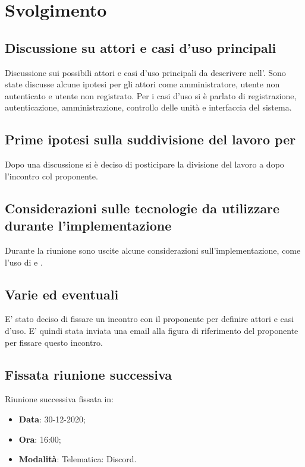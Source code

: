\documentclass[]{article}
\begin{document}
	\newpage

	\section{Svolgimento}
		\subsection{Discussione su attori e casi d'uso principali}
        Discussione sui possibili attori e casi d'uso principali da descrivere nell'. Sono state discusse alcune ipotesi per gli attori come amministratore, utente non autenticato e utente non registrato. Per i casi d'uso si è parlato di registrazione, autenticazione, amministrazione, controllo delle unità e interfaccia del sistema.

        \subsection{Prime ipotesi sulla suddivisione del lavoro per }
        Dopo una discussione si è deciso di posticipare la divisione del lavoro a dopo l'incontro col proponente.
        
        \subsection{Considerazioni sulle tecnologie da utilizzare durante l'implementazione}
        Durante la riunione sono uscite alcune considerazioni sull'implementazione, come l'uso di  e .
        
        \subsection{Varie ed eventuali}
        E' stato deciso di fissare un incontro con il proponente per definire attori e casi d'uso. E' quindi stata inviata una email alla figura di riferimento del proponente per fissare questo incontro.

		\subsection{Fissata riunione successiva}
		Riunione successiva fissata in:
		\begin{itemize}
			\item \textbf{Data}: 30-12-2020;
			\item \textbf{Ora}: 16:00;
			\item \textbf{Modalità}: Telematica: Discord.
		\end{itemize}

	\newpage

	
\end{document}

